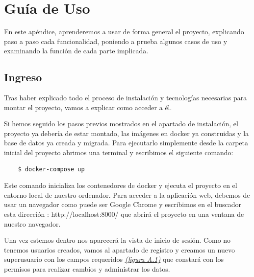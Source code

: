 \appendix 

\chapter{Guía de Uso}

En este apéndice, aprenderemos a usar de forma general el proyecto, explicando paso a paso cada funcionalidad, poniendo a prueba algunos casos de uso y examinando la función de cada parte implicada.

\section{Ingreso}

Tras haber explicado todo el proceso de instalación y tecnologías necesarias para montar el proyecto, vamos a explicar como acceder a él. 

Si hemos seguido los pasos previos mostrados en el apartado de instalación, el proyecto ya debería de estar montado, las imágenes en docker ya construidas y la base de datos ya creada y migrada. Para ejecutarlo simplemente desde la carpeta inicial del proyecto abrimos una terminal y escribimos el siguiente comando:

\begin{verbatim} 
    $ docker-compose up
\end{verbatim}

Este comando inicializa los contenedores de docker y ejecuta el proyecto en el entorno local de nuestro ordenador. Para acceder a la aplicación web, debemos de usar un navegador como puede ser Google Chrome y escribimos en el buscador esta dirección : http://localhost:8000/ que abrirá el proyecto en una ventana de nuestro navegador.

Una vez estemos dentro nos aparecerá la vista de inicio de sesión. Como no tenemos usuarios creados, vamos al apartado de registro y creamos un nuevo superusuario con los campos requeridos \textit{\hyperref[fig:vista-registro]{(figura A.1)}} que constará con los permisos para realizar cambios y administrar los datos. \vspace{1cm}

